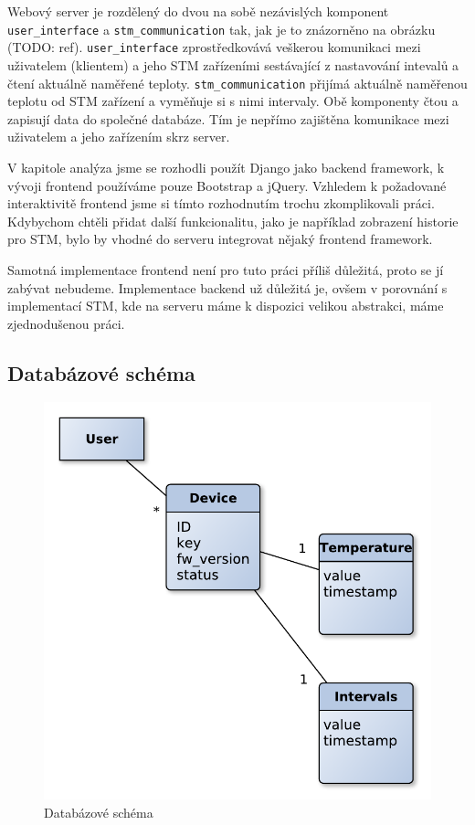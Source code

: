

Webový server je rozdělený do dvou na sobě nezávislých komponent \texttt{user\_interface} a
\texttt{stm\_communication} tak, jak je to znázorněno na obrázku (TODO: ref).
\texttt{user\_interface} zprostředkovává veškerou komunikaci mezi uživatelem (klientem) a jeho STM
zařízeními sestávající z nastavování intevalů a čtení aktuálně naměřené teploty.
\texttt{stm\_communication} přijímá aktuálně naměřenou teplotu od STM zařízení a vyměňuje si s nimi intervaly.
Obě komponenty čtou a zapisují data do společné databáze.
Tím je nepřímo zajištěna komunikace mezi uživatelem a jeho zařízením skrz server.

V kapitole analýza jsme se rozhodli použít Django jako backend framework, k vývoji frontend
používáme pouze Bootstrap a jQuery.
Vzhledem k požadované interaktivitě frontend jsme si tímto rozhodnutím trochu zkomplikovali práci.
Kdybychom chtěli přidat další funkcionalitu, jako je například zobrazení historie pro STM,
bylo by vhodné do serveru integrovat nějaký frontend framework.

Samotná implementace frontend není pro tuto práci příliš důležitá, proto se jí zabývat nebudeme.
Implementace backend už důležitá je, ovšem v porovnání s implementací STM, kde na serveru máme
k dispozici velikou abstrakci, máme zjednodušenou práci.

\subsection{Databázové schéma}

\begin{figure}[tbh]\centering
\includegraphics[scale=0.8]{../diagrams/databazove_schema.pdf}
\caption{Databázové schéma}
\label{databazove-schema}
\end{figure}

